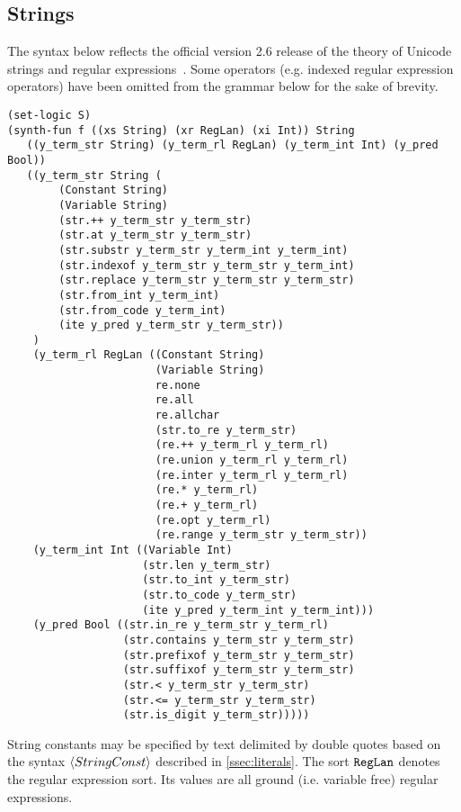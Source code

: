 \documentclass[english,a4paper,10pt]{article}
\begin{document}
\begin{appendix}
\subsection{Strings}

The syntax below reflects the official version 2.6 release of the theory
of Unicode strings and regular expressions~\cite{BarFT-RR-17}.
Some operators (e.g. indexed regular expression operators)
have been omitted from the grammar below for the sake of brevity.
\begin{lstlisting}[language=SyGuS]
(set-logic S)
(synth-fun f ((xs String) (xr RegLan) (xi Int)) String
   ((y_term_str String) (y_term_rl RegLan) (y_term_int Int) (y_pred Bool))
   ((y_term_str String (
        (Constant String)
        (Variable String)
        (str.++ y_term_str y_term_str)
        (str.at y_term_str y_term_str)
        (str.substr y_term_str y_term_int y_term_int)
        (str.indexof y_term_str y_term_str y_term_int)
        (str.replace y_term_str y_term_str y_term_str)
        (str.from_int y_term_int)
        (str.from_code y_term_int)
        (ite y_pred y_term_str y_term_str))
    )
    (y_term_rl RegLan ((Constant String)
                       (Variable String)
                       re.none
                       re.all
                       re.allchar
                       (str.to_re y_term_str)
                       (re.++ y_term_rl y_term_rl)
                       (re.union y_term_rl y_term_rl)
                       (re.inter y_term_rl y_term_rl)
                       (re.* y_term_rl)
                       (re.+ y_term_rl)
                       (re.opt y_term_rl)
                       (re.range y_term_str y_term_str))
    (y_term_int Int ((Variable Int)
                     (str.len y_term_str)
                     (str.to_int y_term_str)
                     (str.to_code y_term_str)
                     (ite y_pred y_term_int y_term_int)))
    (y_pred Bool ((str.in_re y_term_str y_term_rl)
                  (str.contains y_term_str y_term_str)
                  (str.prefixof y_term_str y_term_str)
                  (str.suffixof y_term_str y_term_str)
                  (str.< y_term_str y_term_str)
                  (str.<= y_term_str y_term_str)
                  (str.is_digit y_term_str)))))
\end{lstlisting}
String constants may be specified by text delimited by double quotes
based on the syntax $\left\langle StringConst\right\rangle$ described in \cref{ssec:literals}.
The sort ${\tt RegLan}$ denotes the regular expression sort.
Its values are all ground (i.e. variable free) regular expressions.


\end{appendix}
\end{document}
